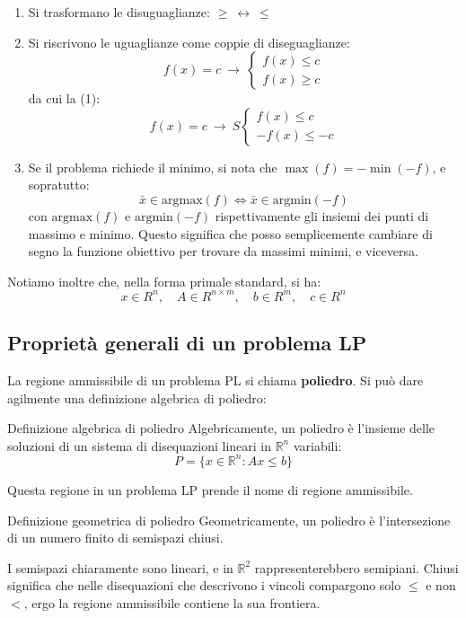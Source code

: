 \documentclass[a4paper,11pt]{article}
\begin{document}
\begin{enumerate}
	\item Si trasformano le disuguaglianze: $ \geq \ \leftrightarrow \ \leq $
	\item Si riscrivono le uguaglianze come coppie di diseguaglianze:
		$$
			f(x) = c \ \rightarrow \
		\begin{cases}
			f(x) \leq c \\ 
			f(x) \geq c
		\end{cases}
		$$
		da cui la (1):
		$$
			f(x) = c \ \rightarrow \
S		\begin{cases}
			f(x) \leq c \\ 
			-f(x) \leq -c
		\end{cases}
		$$
	\item Se il problema richiede il minimo, si nota che $ \max(f) = -\min(-f) $, e sopratutto:
		$$
		\bar{x} \in \mathrm{argmax}(f) \Leftrightarrow \bar{x} \in \mathrm{argmin}(-f)
		$$
		con $ \mathrm{argmax}(f) $ e $ \mathrm{argmin}(-f) $ rispettivamente gli insiemi dei punti di massimo e minimo.
		Questo significa che posso semplicemente cambiare di segno la funzione obiettivo per trovare da massimi minimi, e viceversa.
\end{enumerate}

Notiamo inoltre che, nella forma primale standard, si ha:
$$
	x \in R^n, \quad
	A \in R^{n \times m}, \quad
	b \in R^m, \quad
	c \in R^n
$$

\subsection{Proprietà generali di un problema LP}
La regione ammissibile di un problema PL si chiama \textbf{poliedro}.
Si può dare agilmente una definizione algebrica di poliedro:
\begin{definition}{Definizione algebrica di poliedro}
	Algebricamente, un poliedro è l'insieme delle soluzioni di un sistema di disequazioni lineari in $\mathbb{R}^n$ variabili:
	$$
		P = \{ x \in \mathbb{R}^n : Ax \leq b \}
	$$
\end{definition}

Questa regione in un problema LP prende il nome di regione ammissibile.

\begin{definition}{Definizione geometrica di poliedro}
	Geometricamente, un poliedro è l'intersezione di un numero finito di semispazi chiusi.
\end{definition}

I semispazi chiaramente sono lineari, e in $\mathbb{R}^2$ rappresenterebbero semipiani.
Chiusi significa che nelle disequazioni che descrivono i vincoli compargono solo $\leq$ e non $<$, ergo la regione ammissibile contiene la sua frontiera.
\end{document}
